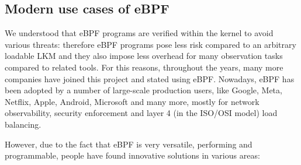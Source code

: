 \subsection{Modern use cases of eBPF}

We understood that eBPF programs are verified within the kernel to avoid various threats: therefore eBPF programs pose less risk compared to an arbitrary loadable LKM and they also impose less overhead for many observation tasks compared to related tools.
For this reasons, throughout the years, many more companies have joined this project and stated using eBPF.
Nowadays, eBPF has been adopted by a number of large-scale production users, like Google, Meta, Netflix, Apple, Android, Microsoft and many more, mostly for network observability, security enforcement and layer 4 (in the ISO/OSI model) load balancing.

However, due to the fact that eBPF is very versatile, performing and programmable, people have found innovative solutions in various areas:

